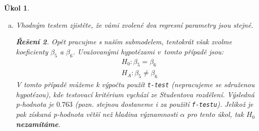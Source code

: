 \documentclass[11pt, a4paper]{article}
\theoremstyle{result}
\newtheorem*{result}{Řešení}
\newtheorem{task}{Úkol}
\begin{document}
\begin{task}
\begin{enumerate}[a)]
        \begin{result}
            Pracujeme s naším submodelem a zvolíme například koeficienty $\beta_1$ a $\beta_4$. Uvažujeme následující sdružené hypotézy:
            \begin{align*}
                &H_0: (\beta_1, \beta_4) = (0, 0) \\
                &H_A: (\beta_1, \beta_4) \neq (0, 0)
            \end{align*}
            Jelikož testujeme sdružené hypotézy, tak použijeme \verb|f-test|. Testovací kritérium zde tedy vychází z Fisher-Snedecorova rozdělení. Získaná \textit{p-hodnota} je pak téměř nulová (2.38e-54), je tedy dozajista menší než naše uvažovaná hladina významnosti, a proto $H_0$ \textbf{zamítáme}. Dle testu tedy platí $H_A: (\beta_1, \beta_4) \neq (0, 0)$.
        \end{result}
        
        \item Vhodným testem zjistěte, že vámi zvolené dva regresní parametry jsou stejné.

        \begin{result}
            Opět pracujme s naším submodelem, tentokrát však zvolme koeficienty $\beta_5$ a $\beta_6$. Uvažovanými hypotézami v~tomto případě jsou:
            \begin{align*}
                &H_0: \beta_5 = \beta_6 \\
                &H_A: \beta_5 \neq \beta_6
            \end{align*}
            V tomto případě můžeme k výpočtu použít \verb|t-test| (nepracujeme se sdruženou hypotézou), kde testovací kritérium vychází ze Studentova rozdělení. Výsledná \textit{p-hodnota} je $0.763$ (pozn. stejnou dostaneme i za použití \verb|f-testu|). Jelikož je pak získaná \textit{p-hodnota} větší než hladina významnosti $\alpha$ pro tento úkol, tak $H_0$ \textbf{nezamítáme}.
        \end{result}
    \end{enumerate}
\end{task}
\end{document}
